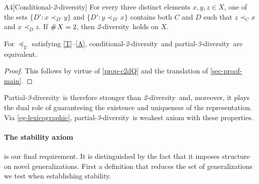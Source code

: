 \documentclass[12pt,a4paper,twoside]{article}
\newcommand{\countof}{\mathbin{\#}\hskip1pt}
\newcommand{\mbbd}{{\mathds D}}
\newcommand{\parthreediv}{\textup{partial-\textit{3}-diversity}}
\newcommand{\Parthreediv}{\textup{Partial-\textit{3}-diversity}}
\newcommand{\condtwodiv}{\textup{conditional-\textit{2}-diversity}}
\newcommand{\twodiv}{\textit{2}-\textup{diversity}}
\begin{document}
\begin{taggedblank}{\textup{A}$4$}[Conditional-\twodiv]\label{c2d}
  For every three distinct elements $x , y , z \in X$, one of the sets
  $\{D' : x \prec _{D '} y \}$ and $\{D' : y \prec_{D '} x \}$ contains 
  both $C$ and $D$ such that $z \prec _{C} x$ and
  $x \prec _{D} z$. If $\countof X = 2$, then \twodiv\ holds on $X$.

\end{taggedblank}


\begin{observation}\label{obs-c2d}
  For $\preceq_{\mbbd}$ satisfying \ref{T}--\ref{A}, \condtwodiv\ and
  \parthreediv\ are equivalent.
\end{observation}
\begin{proof}\label{proof-obs-c2d}
  This follows by virtue of \cref{prop-c2dQ} and the translation of
  \cref{sec-proof-main}.
\end{proof}
\Parthreediv\ is therefore stronger than \twodiv\ and, moreover, it plays the
dual role of guaranteeing the existence and uniqueness of the representation.
Via \cref{eg-lexicographic}, \parthreediv\ is weakest axiom with these
properties.
\paragraph{The {stability} axiom \hskip-10pt} is our final requirement. It is
distinguished by the fact that it imposes structure on novel {generalization}s.  First
a definition that reduces the set of {generalization}s we test when establishing
{stability}.
\end{document}
